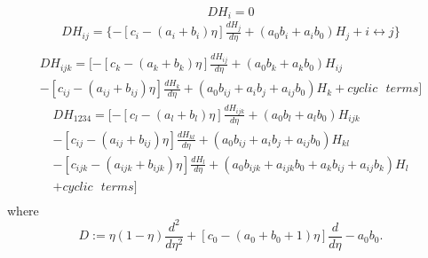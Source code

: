 \documentclass[a4paper,11pt]{article}
\begin{document}
\begin{equation}
DH_{i}=0
\end{equation}
\begin{eqnarray}
DH_{ij}=\{-[c_{i}-(a_{i}+b_{i})\eta]
\frac{dH_{j}}{d\eta}+(a_{0}b_{i}+a_{i}b_{0})H_{j}+
i\longleftrightarrow j\}\nonumber\\
\end{eqnarray}
\begin{eqnarray}
DH_{ijk}=[-[c_{k}-(a_{k}+b_{k})\eta]\frac{dH_{ij}}{d\eta}+
(a_{0}b_{k}+a_{k}b_{0})H_{ij}\nonumber\\
-[c_{ij}-(a_{ij}+b_{ij})\eta]\frac{dH_{k}}{d\eta}
+(a_{0}b_{ij}+a_{i}b_{j}+a_{ij}b_{0})H_{k}+cyclic\:\:\: terms ]
\end{eqnarray}
\begin{eqnarray}
DH_{1234}=[-[c_{l}-(a_{l}+b_{l})\eta]\frac{dH_{ijk}}{d\eta}+(a_{0}b_{l}+a_{l}b_{0})H_{ijk}\nonumber\\
-[c_{ij}-(a_{ij}+b_{ij})\eta]\frac{dH_{kl}}{d\eta}+(a_{0}b_{ij}+a_{i}b_{j}+a_{ij}b_{0})H_{kl}\nonumber\\
-[c_{ijk}-(a_{ijk}+b_{ijk})\eta]\frac{dH_{l}}{d\eta}+(a_{0}b_{ijk}+a_{ijk}b_{0}+a_{k}b_{ij}+a_{ij}b_{k})H_{l}\nonumber\\
+cyclic\:\:\:terms]\nonumber\\
\end{eqnarray}
where
\begin{equation}
D:=\eta(1-\eta)\frac{d^{2}}{d\eta^{2}}+[c_{0}-(a_{0}+b_{0}+1)\eta]
\frac{d}{d\eta}-a_{0}b_{0}.
\end{equation}
\end{document}
